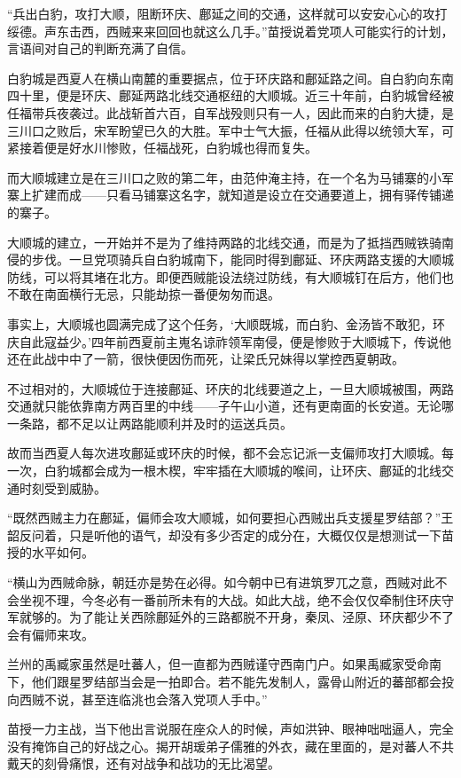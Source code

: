 “兵出白豹，攻打大顺，阻断环庆、鄜延之间的交通，这样就可以安安心心的攻打绥德。声东击西，西贼来来回回也就这么几手。”苗授说着党项人可能实行的计划，言语间对自己的判断充满了自信。

白豹城是西夏人在横山南麓的重要据点，位于环庆路和鄜延路之间。自白豹向东南四十里，便是环庆、鄜延两路北线交通枢纽的大顺城。近三十年前，白豹城曾经被任福带兵夜袭过。此战斩首六百，自军战殁则只有一人，因此而来的白豹大捷，是三川口之败后，宋军盼望已久的大胜。军中士气大振，任福从此得以统领大军，可紧接着便是好水川惨败，任福战死，白豹城也得而复失。

而大顺城建立是在三川口之败的第二年，由范仲淹主持，在一个名为马铺寨的小军寨上扩建而成——只看马铺寨这名字，就知道是设立在交通要道上，拥有驿传铺递的寨子。

大顺城的建立，一开始并不是为了维持两路的北线交通，而是为了抵挡西贼铁骑南侵的步伐。一旦党项骑兵自白豹城南下，能同时得到鄜延、环庆两路支援的大顺城防线，可以将其堵在北方。即便西贼能设法绕过防线，有大顺城钉在后方，他们也不敢在南面横行无忌，只能劫掠一番便匆匆而退。

事实上，大顺城也圆满完成了这个任务，‘大顺既城，而白豹、金汤皆不敢犯，环庆自此寇益少。’四年前西夏前主嵬名谅祚领军南侵，便是惨败于大顺城下，传说他还在此战中中了一箭，很快便因伤而死，让梁氏兄妹得以掌控西夏朝政。

不过相对的，大顺城位于连接鄜延、环庆的北线要道之上，一旦大顺城被围，两路交通就只能依靠南方两百里的中线——子午山小道，还有更南面的长安道。无论哪一条路，都不足以让两路能顺利并及时的运送兵员。

故而当西夏人每次进攻鄜延或环庆的时候，都不会忘记派一支偏师攻打大顺城。每一次，白豹城都会成为一根木楔，牢牢插在大顺城的喉间，让环庆、鄜延的北线交通时刻受到威胁。

“既然西贼主力在鄜延，偏师会攻大顺城，如何要担心西贼出兵支援星罗结部？”王韶反问着，只是听他的语气，却没有多少否定的成分在，大概仅仅是想测试一下苗授的水平如何。

“横山为西贼命脉，朝廷亦是势在必得。如今朝中已有进筑罗兀之意，西贼对此不会坐视不理，今冬必有一番前所未有的大战。如此大战，绝不会仅仅牵制住环庆守军就够的。为了能让关西除鄜延外的三路都脱不开身，秦凤、泾原、环庆都少不了会有偏师来攻。

兰州的禹臧家虽然是吐蕃人，但一直都为西贼谨守西南门户。如果禹臧家受命南下，他们跟星罗结部当会是一拍即合。若不能先发制人，露骨山附近的蕃部都会投向西贼不说，甚至连临洮也会落入党项人手中。”

苗授一力主战，当下他出言说服在座众人的时候，声如洪钟、眼神咄咄逼人，完全没有掩饰自己的好战之心。揭开胡瑗弟子儒雅的外衣，藏在里面的，是对蕃人不共戴天的刻骨痛恨，还有对战争和战功的无比渴望。


